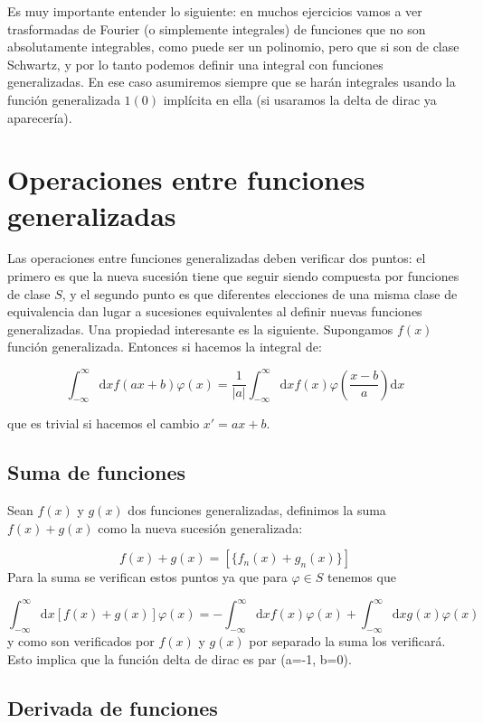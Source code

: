 \documentclass[12pt]{book}
\newcommand{\parentesis}[1]{\left( #1  \right)}
\newcommand{\D}{\mathrm{d}}
\newcommand{\inti}{\int_{-\infty}^{\infty}}
\begin{document}
Es muy importante entender lo siguiente: en muchos ejercicios vamos a ver trasformadas de Fourier (o simplemente integrales) de funciones que no son absolutamente integrables, como puede ser un polinomio, pero que si son de clase Schwartz, y por lo tanto podemos definir una integral con funciones generalizadas. En ese caso asumiremos siempre que se harán integrales usando la función generalizada $1(0)$ implícita en ella (si usaramos la delta de dirac ya aparecería). 

\section{Operaciones entre funciones generalizadas}

Las operaciones entre funciones generalizadas deben verificar dos puntos: el primero es que la nueva sucesión tiene que seguir siendo compuesta por funciones de clase $S$, y el segundo punto es que diferentes elecciones de una misma clase de equivalencia dan lugar a sucesiones equivalentes al definir nuevas funciones generalizadas. Una propiedad interesante es la siguiente. Supongamos $f(x)$ función generalizada. Entonces si hacemos la integral de:

\begin{equation}
\inti \D x  f(ax+b) \varphi (x)  = \dfrac{1}{|a|} \inti \D x f(x) \varphi \parentesis{\frac{x-b}{a}} \D x
\end{equation}

que es trivial si hacemos el cambio $x' = ax+ b$. 

\subsection{Suma de funciones}

Sean $f(x)$ y $g(x)$ dos funciones generalizadas, definimos la suma $f(x) + g(x)$ como la nueva sucesión generalizada:

\begin{equation}
f(x) + g(x) = [ \{ f_n (x) + g_n (x) \} ]
\end{equation}
Para la suma se verifican estos puntos ya que para $\varphi \in S$ tenemos que

$$ \inti \D x [f(x) + g(x)] \varphi (x) = - \inti \D x f(x) \varphi (x) + \inti \D x g(x) \varphi (x) $$
y como son verificados por $f(x)$ y $g(x)$ por separado la suma los verificará. Esto implica que la función delta de dirac es par (a=-1, b=0). 

\subsection{Derivada de funciones}
\end{document}
